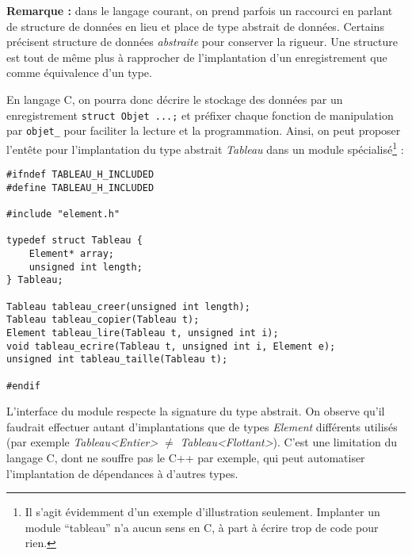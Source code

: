 \documentclass[../../../main.tex]{subfiles}
\begin{document}
\textbf{Remarque :} dans le langage courant, on prend parfois un raccourci en parlant de structure de données en lieu et place de type abstrait de données. Certains précisent structure de données \textit{abstraite} pour conserver la rigueur. Une structure est tout de même plus à rapprocher de l'implantation d'un enregistrement que comme équivalence d'un type.

En langage C, on pourra donc décrire le stockage des données par un enregistrement \texttt{struct Objet {...};} et préfixer chaque fonction de manipulation par \texttt{objet_} pour faciliter la lecture et la programmation. Ainsi, on peut proposer l'entête pour l'implantation du type abstrait \textit{Tableau} dans un module spécialisé\footnote{Il s'agit évidemment d'un exemple d'illustration seulement. Implanter un module ``tableau'' n'a aucun sens en C, à part à écrire trop de code pour rien.} :
\begin{verbatim}
#ifndef TABLEAU_H_INCLUDED
#define TABLEAU_H_INCLUDED

#include "element.h"

typedef struct Tableau {
	Element* array;
	unsigned int length;
} Tableau;

Tableau tableau_creer(unsigned int length);
Tableau tableau_copier(Tableau t);
Element tableau_lire(Tableau t, unsigned int i);
void tableau_ecrire(Tableau t, unsigned int i, Element e);
unsigned int tableau_taille(Tableau t);

#endif
\end{verbatim}
L'interface du module respecte la signature du type abstrait. On observe qu'il faudrait effectuer autant d'implantations que de types \textit{Element} différents utilisés (par exemple \textit{Tableau\textless Entier\textgreater} $\neq$ \textit{Tableau\textless Flottant\textgreater}). C'est une limitation du langage C, dont ne souffre pas le C++ par exemple, qui peut automatiser l'implantation de dépendances à d'autres types.
\end{document}
